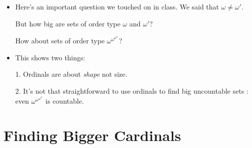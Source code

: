 \documentclass[justified]{tufte-handout}
\begin{document}
\begin{itemize}

\item Here's an important question we touched on in class. We said that $\omega \neq \omega'$. 

But how big are sets of order type $\omega$ and $\omega'$?

How about sets of order type $\omega^{\omega^{\omega^\omega}}$?

\item This shows two things: 

1. Ordinals are about \emph{shape} not size.

2. It's not that straightforward to use ordinals to find big uncountable sets : even $\omega^{\omega^{\omega^\omega}}$ is countable.



\end{itemize}




\section{Finding Bigger Cardinals}
\end{document}
